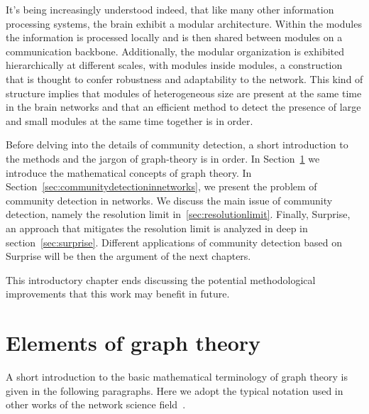 It's being increasingly understood indeed, that like many other information processing systems, the brain exhibit a modular architecture.
Within the modules the information is processed locally and is then shared between modules on a communication backbone.
Additionally, the modular organization is exhibited hierarchically at different scales, with modules inside modules, a construction that is thought to confer robustness and adaptability to the network. This kind of structure implies that modules of heterogeneous size are present at the same time in the brain networks and that an efficient method to detect the presence of large and small modules at the same time together is in order.



Before delving into the details of community detection, a short introduction to the methods and the jargon of graph-theory is in order.
In Section~\ref{sec:elementsofgraphtheory} we introduce the mathematical concepts of graph theory. In Section~\ref{sec:communitydetectioninnetworks}, we present the problem of community detection in networks. We discuss the main issue of community detection, namely the resolution limit in~\ref{sec:resolutionlimit}. Finally, Surprise, an approach that mitigates the resolution limit is analyzed in deep in section~\ref{sec:surprise}. Different applications of community detection based on Surprise will be then the argument of the next chapters.

This introductory chapter ends discussing the potential methodological improvements that this work may benefit in future.


\section{Elements of graph theory}\label{sec:elementsofgraphtheory}
A short introduction to the basic mathematical terminology of graph theory is given in the following paragraphs. Here we adopt the typical notation used in other works of the network science field~\cite{newman2010book,Estrada2011}.

